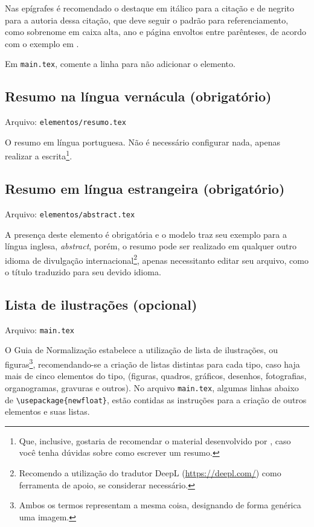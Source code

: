     Nas epígrafes é recomendado o destaque em itálico para a citação e de negrito para a autoria dessa citação, que deve seguir o padrão para referenciamento, como sobrenome em caixa alta, ano e página envoltos entre parênteses, de acordo com o exemplo em \textcite[figura 14, p. 39]{livro:iffar-guia-normalizacao-2022}.

    Em \texttt{main.tex}, comente a linha \verb|| para não adicionar o elemento.

\subsection{Resumo na língua vernácula (obrigatório)}\myIdxResumoVernac
    Arquivo: \texttt{elementos/resumo.tex}

    O resumo em língua portuguesa. Não é necessário configurar nada, apenas realizar a escrita\footnote{Que, inclusive, gostaria de recomendar o material desenvolvido por \textcite{pdf:resumo-aluisio}, caso você tenha dúvidas sobre como escrever um resumo.}.

\subsection{Resumo em língua estrangeira (obrigatório)}\myIdxAbstract
    Arquivo: \texttt{elementos/abstract.tex}

    A presença deste elemento é obrigatória e o modelo traz seu exemplo para a língua inglesa, \textit{abstract}, porém, o resumo pode ser realizado em qualquer outro idioma de divulgação internacional\footnote{Recomendo a utilização do tradutor DeepL (\url{https://deepl.com/}) como ferramenta de apoio, se considerar necessário.}, apenas necessitanto editar seu arquivo, como o título traduzido para seu devido idioma.

\subsection{Lista de ilustrações (opcional)}
    Arquivo: \texttt{main.tex}

    O Guia de Normalização \cite{livro:iffar-guia-normalizacao-2022} estabelece a utilização de lista de ilustrações, ou figuras\footnote{Ambos os termos representam a mesma coisa, designando de forma genérica uma imagem.}, recomendando-se a criação de listas distintas para cada tipo, caso haja mais de cinco elementos do tipo, (figuras, quadros, gráficos, desenhos, fotografias, organogramas, gravuras e outros). No arquivo \texttt{main.tex}, algumas linhas abaixo de \verb|\usepackage{newfloat}|, estão contidas as instruções para a criação de outros elementos e suas listas.


